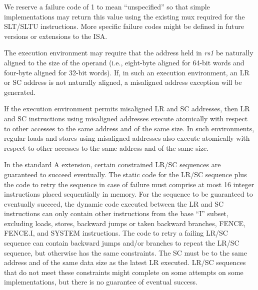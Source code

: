 \begin{commentary}
We reserve a failure code of 1 to mean ``unspecified'' so that simple
implementations may return this value using the existing mux required
for the SLT/SLTU instructions.  More specific failure codes might be
defined in future versions or extensions to the ISA.
\end{commentary}

The execution environment may require that the address held in {\em rs1} be
naturally aligned to the size of the operand (i.e., eight-byte aligned for
64-bit words and four-byte aligned for 32-bit words).  If, in such an
execution environment, an LR or SC address is not naturally aligned,
a misaligned address exception will be generated.

If the execution environment permits misaligned LR and SC addresses, then LR
and SC instructions using misaligned addresses execute atomically with respect
to other accesses to the same address and of the same size.  In such
environments, regular loads and stores using misaligned addresses also execute
atomically with respect to other accesses to the same address and of the same
size.

\label{lrscseq}

In the standard A extension, certain constrained LR/SC sequences are
guaranteed to succeed eventually.  The static code for the LR/SC
sequence plus the code to retry the sequence in case of failure must
comprise at most 16 integer instructions placed sequentially in
memory.  For the sequence to be guaranteed to eventually succeed, the
dynamic code executed between the LR and SC instructions can only
contain other instructions from the base ``I'' subset, excluding
loads, stores, backward jumps or taken backward branches, FENCE,
FENCE.I, and SYSTEM instructions.  The code to retry a failing LR/SC
sequence can contain backward jumps and/or branches to repeat the
LR/SC sequence, but otherwise has the same constraints.  The SC must
be to the same address and of the same data size as the latest LR
executed.  LR/SC sequences that do not meet these constraints might
complete on some attempts on some implementations, but there is no
guarantee of eventual success.

